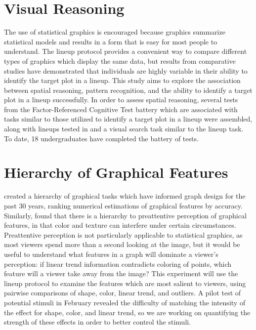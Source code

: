 \documentclass[11pt]{isuthesis}\usepackage[]{graphicx}\usepackage[]{color}
\begin{document}
\section{Visual Reasoning}
The use of statistical graphics is encouraged because graphics summarize statistical models and results in a form that is easy for most people to understand. The lineup protocol provides a convenient way to compare different types of graphics which display the same data, but results from comparative studies\citep{hofmann2012graphical} have demonstrated that individuals are highly variable in their ability to identify the target plot in a lineup. This study aims to explore the association between spatial reasoning, pattern recognition, and the ability to identify a target plot in a lineup successfully. In order to assess spatial reasoning, several tests from the Factor-Referenced Cognitive Test battery \citep{ekstrom1976manual} which are associated with tasks similar to those utilized to identify a target plot in a lineup were assembled, along with lineups tested in \citep{hofmann2012graphical} and a visual search task similar to the lineup task. To date, 18 undergraduates have completed the battery of tests. 

\section{Hierarchy of Graphical Features}
\citet{cleveland:1984} created a hierarchy of graphical tasks which have informed graph design for the past 30 years, ranking numerical estimations of graphical features by accuracy. Similarly, \citet{healey1999large} found that there is a hierarchy to preattentive perception of graphical features, in that color and texture can interfere under certain circumstances. Preattentive perception is not particularly applicable to statistical graphics, as most viewers spend more than a second looking at the image, but it would be useful to understand what features in a graph will dominate a viewer's perception: if linear trend information contradicts coloring of points, which feature will a viewer take away from the image? This experiment will use the lineup protocol to examine the features which are most salient to viewers, using pairwise comparisons of shape, color, linear trend, and outliers. A pilot test of potential stimuli in February revealed the difficulty of matching the intensity of the effect for shape, color, and linear trend, so we are working on quantifying the strength of these effects in order to better control the stimuli.
\end{document}
